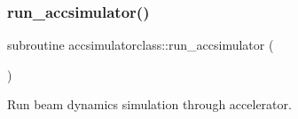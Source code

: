 \mbox{\label{namespaceaccsimulatorclass_acbe26eeaf1cb4076384b90e1016785f0}} 
\subsubsection{\texorpdfstring{run\_accsimulator()}{run\_accsimulator()}}
{\footnotesize\ttfamily subroutine accsimulatorclass\+::run\+\_\+accsimulator (\begin{DoxyParamCaption}{ }\end{DoxyParamCaption})}



Run beam dynamics simulation through accelerator. 

